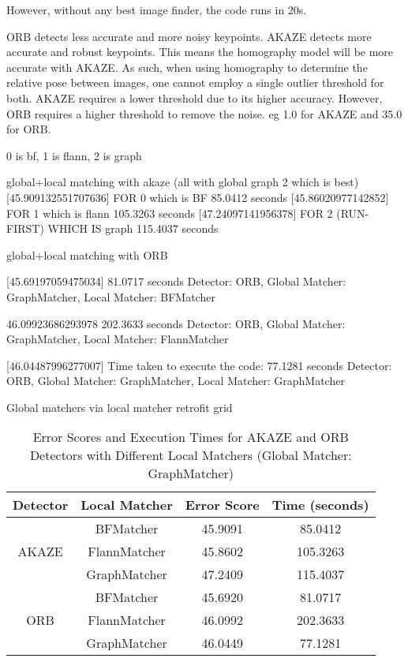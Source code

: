     However, without any best image finder, the code runs in 20s.       





ORB detects less accurate and more noisy keypoints. AKAZE detects more accurate and robust keypoints. This means the homography model will be more accurate with AKAZE. As such, when using homography to determine the relative pose between images, one cannot employ a single outlier threshold for both. AKAZE requires a lower threshold due to its higher accuracy. However, ORB requires a higher threshold to remove the noise.
eg 1.0 for AKAZE and 35.0 for ORB. 




0 is bf, 1 is flann, 2 is graph

global+local matching with akaze (all with global graph 2 which is best)
[45.909132551707636] FOR 0 which is BF 85.0412 seconds
[45.86020977142852] FOR 1 which is flann 105.3263 seconds
[47.24097141956378] FOR 2 (RUN-FIRST) WHICH IS graph 115.4037 seconds


global+local matching with ORB

[45.69197059475034] 81.0717 seconds Detector: ORB, Global Matcher: GraphMatcher, Local Matcher: BFMatcher

46.09923686293978 202.3633 seconds Detector: ORB, Global Matcher: GraphMatcher, Local Matcher: FlannMatcher  

[46.04487996277007] Time taken to execute the code: 77.1281 seconds Detector: ORB, Global Matcher: GraphMatcher, Local Matcher: GraphMatcher


Global matchers via local matcher retrofit grid

\begin{table}[H]
    \centering
    \begin{tabular}{|c|c|c|c|}
    \hline
    \textbf{Detector} & \textbf{Local Matcher} & \textbf{Error Score} & \textbf{Time (seconds)} \\ \hline
    \multirow{3}{*}{AKAZE} & BFMatcher & 45.9091 & 85.0412 \\ \cline{2-4}
                           & FlannMatcher & 45.8602 & 105.3263 \\ \cline{2-4}
                           & GraphMatcher & 47.2409 & 115.4037 \\ \hline
    \multirow{3}{*}{ORB}   & BFMatcher & 45.6920 & 81.0717 \\ \cline{2-4}
                           & FlannMatcher & 46.0992 & 202.3633 \\ \cline{2-4}
                           & GraphMatcher & 46.0449 & 77.1281 \\ \hline
    \end{tabular}
    \caption{Error Scores and Execution Times for AKAZE and ORB Detectors with Different Local Matchers (Global Matcher: GraphMatcher)}
    \end{table}
    



